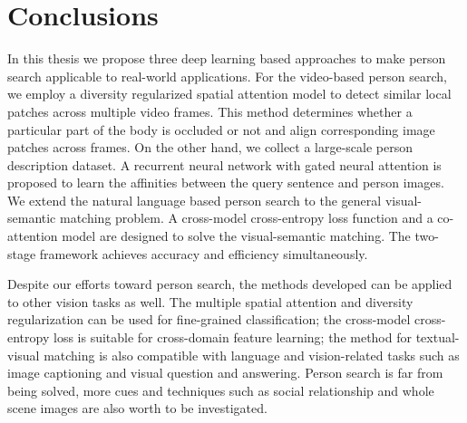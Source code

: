 \chapter{Conclusions}
\label{ch:conclusions}
In this thesis we propose three deep learning based approaches to make person search applicable to real-world applications. For the video-based person search, we employ a diversity regularized spatial attention model to detect similar local patches across multiple video frames. This method determines whether a particular part of the body is occluded or not and align corresponding image patches across frames.
On the other hand, we collect a large-scale person description dataset. A recurrent neural network with gated neural attention is proposed to learn the affinities between the query sentence and person images. We extend the natural language based person search to the general visual-semantic matching problem. A cross-model cross-entropy loss function and a co-attention model are designed to solve the visual-semantic matching. The two-stage framework achieves accuracy and efficiency simultaneously.

Despite our efforts toward person search, the methods developed can be applied to other vision tasks as well. The multiple spatial attention and diversity regularization can be used for fine-grained classification; the cross-model cross-entropy loss is suitable for cross-domain feature learning; the method for textual-visual matching is also compatible with language and vision-related tasks such as image captioning and visual question and answering. Person search is far from being solved, more cues and techniques such as social relationship and whole scene images are also worth to be investigated.